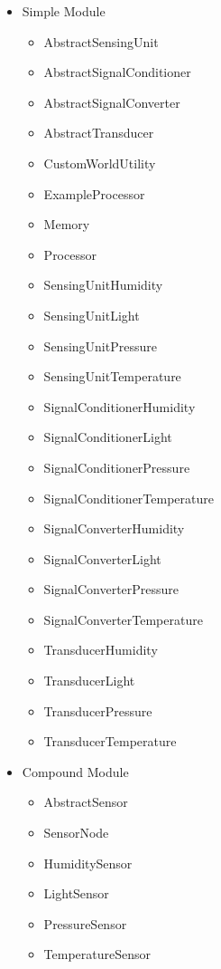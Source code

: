 \begin{itemize}{\label{enum:NedModules}}
\item Simple Module
\begin{multicols}{2}
\begin{itemize}
\item AbstractSensingUnit
\item AbstractSignalConditioner
\item AbstractSignalConverter
\item AbstractTransducer
\item CustomWorldUtility
\item ExampleProcessor
\item Memory
\item Processor
\item SensingUnitHumidity
\item SensingUnitLight
\item SensingUnitPressure
\item SensingUnitTemperature
\item SignalConditionerHumidity
\item SignalConditionerLight
\item SignalConditionerPressure
\item SignalConditionerTemperature
\item SignalConverterHumidity
\item SignalConverterLight
\item SignalConverterPressure
\item SignalConverterTemperature
\item TransducerHumidity
\item TransducerLight
\item TransducerPressure
\item TransducerTemperature 
\end{itemize}
\end{multicols}
\item Compound Module
\begin{multicols}{2}
\begin{itemize}
\item AbstractSensor
\item SensorNode
\item HumiditySensor
\item LightSensor
\item PressureSensor
\item TemperatureSensor 
\end{itemize}
\end{multicols}

\end{itemize}
